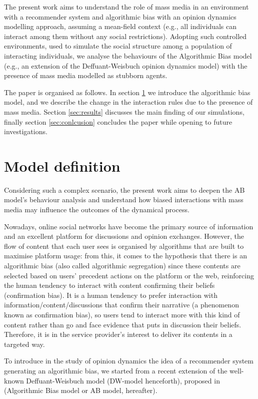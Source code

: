 \documentclass[10pt,letterpaper]{article}
\begin{document}
The present work aims to understand the role of mass media in an environment with a recommender system and algorithmic bias with an opinion dynamics modelling approach, assuming a mean-field context (e.g., all individuals can interact among them without any social restrictions). 
Adopting such controlled environments, used to simulate the social structure among a population of interacting individuals, we analyse the behaviours of the Algorithmic Bias model\cite{Srbu2019AlgorithmicBA} (e.g., an extension of the Deffuant-Weisbuch\cite{DW00} opinion dynamics model) with the presence of mass media modelled as stubborn agents.

\smallskip
The paper is organised as follows. In section \ref{sec:modeldefinition} we introduce the algorithmic bias model, and we describe the change in the interaction rules due to the presence of mass media. Section \ref{sec:results} discusses the main finding of our simulations, finally section \ref{sec:conlcusion} concludes the paper while opening to future investigations.

\section{Model definition}
\label{sec:modeldefinition}
Considering such a complex scenario, the present work aims to deepen the AB model's behaviour analysis and understand how biased interactions with mass media may influence the outcomes of the dynamical process. 

Nowadays, online social networks have become the primary source of information and an excellent platform for 
discussions and 
opinion exchanges. 
However, the flow of content that each user sees is organised by algorithms that are built to maximise platform usage: from this, it comes to the hypothesis that there is an algorithmic bias (also called algorithmic segregation) since these contents are selected based on users' precedent actions on the platform or the web, 
reinforcing the human tendency to interact with content confirming their beliefs (confirmation bias). 
It is a human tendency to prefer interaction with information/content/discussions that confirm their narrative (a phenomenon known as confirmation bias), so users tend to interact more with this kind of content rather than go and face evidence that puts in discussion their beliefs. 
Therefore, it is in the service provider's interest to deliver its contents in a targeted way.


To introduce in the study of opinion dynamics the idea of a recommender system generating an algorithmic bias, we started from a recent extension of the well-known Deffuant-Weisbuch model (DW-model henceforth), proposed in \cite{Srbu2019AlgorithmicBA} (Algorithmic Bias model or AB model, hereafter).
\end{document}
